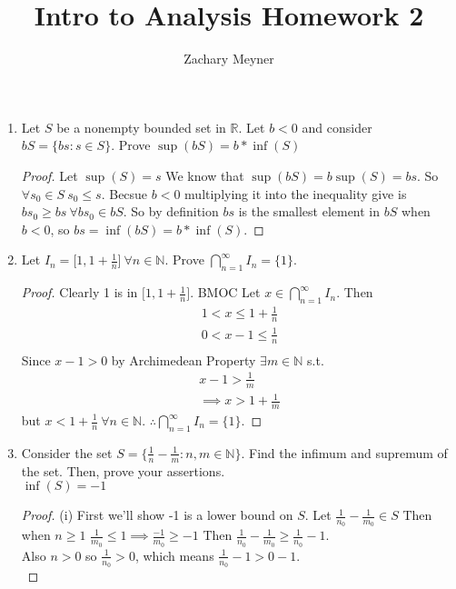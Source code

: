 \documentclass[12pt]{article}
\title{\large Intro to Analysis Homework 2}
\author{\large Zachary Meyner}
\date{}
\begin{document}
\maketitle
\begin{enumerate}
	\item Let $S$ be a nonempty bounded set in $\mathbb{R}$. Let $b<0$ and consider
	      $bS=\{bs:s \in S\}$. Prove $\sup(bS) = b * \inf(S)$
	      \begin{proof}
		      Let $\sup(S) = s$ We know that $\sup(bS) = b\sup(S) = bs$.  So $\forall s_0 \in S \ s_0 \leq s$.
		      Becsue $b < 0$ multiplying it into the inequality give is $bs_0 \geq bs \ \forall bs_0 \in bS$. So by
		      definition $bs$ is the smallest element in $bS$ when $b < 0$, so $bs = \inf(bS) = b*\inf(S)$.
	      \end{proof}
	\item Let $I_n = \Big[1, 1 + \frac{1}{n} \Big] \ \forall n \in \mathbb{N}$. Prove $\bigcap_{n=1}^{\infty} I_n = \{1\}$.
	      \begin{proof}
		      Clearly 1 is in $\Big[1, 1 + \frac{1}{n} \Big]$. BMOC Let $x \in \bigcap_{n=1}^{\infty}I_n$. Then
		      \begin{gather*}
			      1 < x \leq 1 + \frac{1}{n} \\
			      0 < x-1 \leq \frac{1}{n} \\
		      \end{gather*}
		      Since $x-1 > 0$ by Archimedean Property $\exists m \in \mathbb{N}$ s.t.
		      \begin{align*}
			      x-1 > \frac{1}{m} \\
			      \implies x > 1+\frac{1}{m}
		      \end{align*}
		      but $x < 1+ \frac{1}{n} \ \forall n \in \mathbb{N}$. $\therefore \bigcap_{n=1}^{\infty}I_n = \{1\}$.
	      \end{proof}
	\item Consider the set $S = \Big\{\frac{1}{n}-\frac{1}{m}: n,m \in \mathbb{N} \Big\}$. Find the infimum and supremum of the
	      set. Then, prove your assertions. \\
	      $\inf(S) = -1$
	      \begin{proof}
		      (i) First we'll show -1 is a lower bound on $S$. Let $\frac{1}{n_0} - \frac{1}{m_0} \in S$ Then when
		      $n \geq 1$ $\frac{1}{m_0} \leq 1 \implies \frac{-1}{m_0} \geq -1$ Then $\frac{1}{n_0} - \frac{1}{m_0} \geq \frac{1}{n_0} - 1$. \\
		      Also $n>0$ so $\frac{1}{n_0} > 0$, which means $\frac{1}{n_0} - 1 > 0 -1$. \\

\end{proof}
\end{enumerate}
\end{document}
